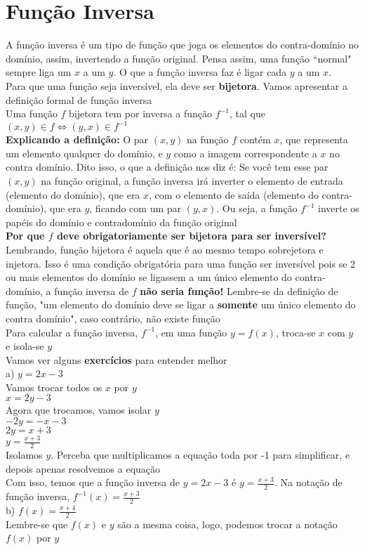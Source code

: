 \documentclass{article}
\begin{document}
\section{Função Inversa}
A função inversa é um tipo de função que joga os elementos do contra-domínio no domínio, assim, invertendo a função original. Pensa assim, uma função ``normal" sempre liga um $x$ a um $y$. O que a função inversa faz é ligar cada $y$ a um $x$.\\[10pt]
Para que uma função seja inversível, ela deve ser \textbf{bijetora}. Vamos apresentar a definição formal de função inversa\\[10pt]
Uma função $f$ bijetora tem por inversa a função $f^{-1}$, tal que $(x, y) \in f \Longleftrightarrow (y, x) \in f^{-1}$\\[10pt]
\textbf{Explicando a definição:} O par $(x, y)$ na função $f$ contém $x$, que representa um elemento qualquer do domínio, e $y$ como a imagem correspondente a $x$ no contra domínio. Dito isso, o que a definição nos diz é: Se você tem esse par $(x, y)$ na função original, a função inversa irá inverter o elemento de entrada (elemento do domínio), que era $x$, com o elemento de saída (elemento do contra-domínio), que era $y$, ficando com um par $(y, x)$. Ou seja, a função $f^{-1}$ inverte os papéis do domínio e contradomínio da função original\\[10pt]
\textbf{Por que $f$ deve obrigatoriamente ser bijetora para ser inversível?}\\
Lembrando, função bijetora é aquela que é ao mesmo tempo sobrejetora e injetora. Isso é uma condição obrigatória para uma função ser inversível pois se 2 ou mais elementos do domínio se ligassem a um único elemento do contra-domínio, a função inversa de $f$ \textbf{não seria função!} Lembre-se da definição de função, "um elemento do domínio deve se ligar a \textbf{somente} um único elemento do contra domínio", caso contrário, não existe função\\[10pt]
Para calcular a função inversa, $f^{-1}$, em uma função $y = f(x)$, troca-se $x$ com $y$ e isola-se $y$\\[10pt]
Vamos ver alguns \textbf{exercícios} para entender melhor\\[10pt]
a) $y = 2x - 3$\\[5pt]Vamos trocar todos os $x$ por $y$\\[5pt]
$x = 2y - 3$\\[5pt]Agora que trocamos, vamos isolar $y$\\[5pt]
$-2y = -x -3$\\[5pt]$2y = x + 3$\\[5pt]$y = \frac{x + 3}{2}$\\[5pt]Isolamos $y$. Perceba que multiplicamos a equação toda por -1 para simplificar, e depois apenas resolvemos a equação\\[5pt]
Com isso, temos que a função inversa de $y = 2x - 3$ é $y = \frac{x + 3}{2}$. Na notação de função inversa, $f^{-1}(x) = \frac{x + 3}{2}$\\[20pt]
b) $f(x) = \frac{x + 4}{2}$\\[5pt] Lembre-se que $f(x)$ e $y$ são a mesma coisa, logo, podemos trocar a notação $f(x)$ por $y$
\end{document}
